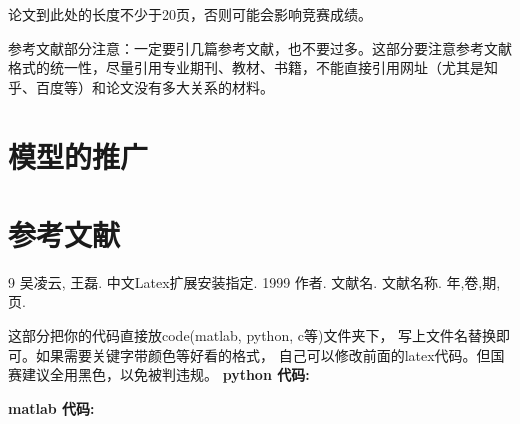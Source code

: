 \documentclass{cumcm}
\begin{document}
论文到此处的长度不少于20页，否则可能会影响竞赛成绩。

参考文献部分注意：一定要引几篇参考文献，也不要过多。这部分要注意参考文献格式的统一性，尽量引用专业期刊、教材、书籍，不能直接引用网址（尤其是知乎、百度等）和论文没有多大关系的材料。
\section{模型的推广}


\section{参考文献} %

\begingroup
\renewcommand{\section}[2]{} %
\begin{thebibliography}{9}
 吴凌云, 王磊. 中文Latex扩展安装指定. 1999
 作者. 文献名. 文献名称. 年,卷,期,页.
\end{thebibliography}
\endgroup
 
\newpage
\begin{appendices}
这部分把你的代码直接放code(matlab, python, c等)文件夹下，
写上文件名替换即可。如果需要关键字带颜色等好看的格式，
自己可以修改前面的latex代码。但国赛建议全用黑色，以免被判违规。
\section{附python代码例子}
\noindent\textbf{python 代码:}


\section{附matlab代码例子}
\noindent\textbf{matlab 代码:}



\end{appendices}
\end{document}
